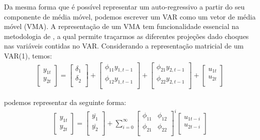 Da mesma forma que é possível representar um auto-regressivo a partir do seu componente de média móvel, podemos escrever um VAR como um vetor de média móvel (VMA). A representação de um VMA tem funcionalidade essencial na metodologia de , a qual permite traçarmos as diferentes projeções dado choques nas variáveis contidas no VAR. Considerando a representação matricial de um VAR(1), temos:
\begin{align} \label{var1mat}
\begin{bmatrix}
    y_{1t} \\
    y_{2t}
\end{bmatrix}
=
\begin{bmatrix}
    \delta_1 \\
    \delta_2 \\
\end{bmatrix}
+
\begin{bmatrix}
    \phi_{11}y_{1,t-1} \\
    \phi_{12}y_{1,t-1} \\
\end{bmatrix}
+
\begin{bmatrix}
    \phi_{21}y_{2,t-1} \\
    \phi_{22}y_{2,t-1} \\
\end{bmatrix}
+
\begin{bmatrix}
    u_{1t} \\
    u_{2t} \\
\end{bmatrix}    
\end{align}

\noindent
podemos representar da seguinte forma:
\begin{align} \label{var2mat}
\begin{bmatrix}
    y_{1t} \\
    y_{2t}
\end{bmatrix}
=
\begin{bmatrix}
    \overline{y_1} \\
    \overline{y_2} \\
\end{bmatrix}
+ \sum_{i=0}^{\infty}
\begin{bmatrix}
    \phi_{11} & \phi_{12} \\
    \phi_{21} & \phi_{22}\\
\end{bmatrix}^i
\begin{bmatrix}
    u_{1t-i} \\
    u_{2t-i} \\
\end{bmatrix}
\end{align}

